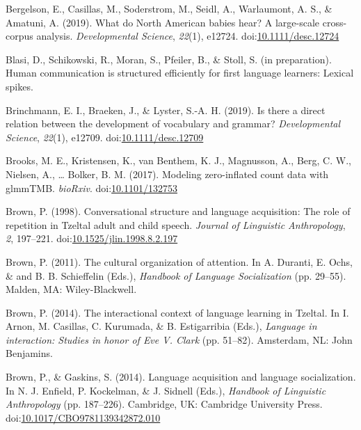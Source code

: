\documentclass[floatsintext,man]{apa6}
\theoremstyle{definition}
\theoremstyle{definition}
\theoremstyle{definition}
\theoremstyle{remark}
\begin{document}
\hypertarget{ref-bergelsoncasillas2019what}{}
Bergelson, E., Casillas, M., Soderstrom, M., Seidl, A., Warlaumont, A.
S., \& Amatuni, A. (2019). What do North American babies hear? A
large-scale cross-corpus analysis. \emph{Developmental Science},
\emph{22}(1), e12724.
doi:\href{https://doi.org/10.1111/desc.12724}{10.1111/desc.12724}

\hypertarget{ref-blasiIPhuman}{}
Blasi, D., Schikowski, R., Moran, S., Pfeiler, B., \& Stoll, S. (in
preparation). Human communication is structured efficiently for first
language learners: Lexical spikes.

\hypertarget{ref-brinchmann2019direct}{}
Brinchmann, E. I., Braeken, J., \& Lyster, S.-A. H. (2019). Is there a
direct relation between the development of vocabulary and grammar?
\emph{Developmental Science}, \emph{22}(1), e12709.
doi:\href{https://doi.org/10.1111/desc.12709}{10.1111/desc.12709}

\hypertarget{ref-brooks2017modeling}{}
Brooks, M. E., Kristensen, K., van Benthem, K. J., Magnusson, A., Berg,
C. W., Nielsen, A., \ldots{} Bolker, B. M. (2017). Modeling
zero-inflated count data with glmmTMB. \emph{bioRxiv}.
doi:\href{https://doi.org/10.1101/132753}{10.1101/132753}

\hypertarget{ref-brown1998conversational}{}
Brown, P. (1998). Conversational structure and language acquisition: The
role of repetition in Tzeltal adult and child speech. \emph{Journal of
Linguistic Anthropology}, \emph{2}, 197--221.
doi:\href{https://doi.org/10.1525/jlin.1998.8.2.197}{10.1525/jlin.1998.8.2.197}

\hypertarget{ref-brown2011cultural}{}
Brown, P. (2011). The cultural organization of attention. In A. Duranti,
E. Ochs, \& and B. B. Schieffelin (Eds.), \emph{Handbook of Language
Socialization} (pp. 29--55). Malden, MA: Wiley-Blackwell.

\hypertarget{ref-brown2014interactional}{}
Brown, P. (2014). The interactional context of language learning in
Tzeltal. In I. Arnon, M. Casillas, C. Kurumada, \& B. Estigarribia
(Eds.), \emph{Language in interaction: Studies in honor of Eve V. Clark}
(pp. 51--82). Amsterdam, NL: John Benjamins.

\hypertarget{ref-brown2014language}{}
Brown, P., \& Gaskins, S. (2014). Language acquisition and language
socialization. In N. J. Enfield, P. Kockelman, \& J. Sidnell (Eds.),
\emph{Handbook of Linguistic Anthropology} (pp. 187--226). Cambridge,
UK: Cambridge University Press.
doi:\href{https://doi.org/10.1017/CBO9781139342872.010}{10.1017/CBO9781139342872.010}
\end{document}

